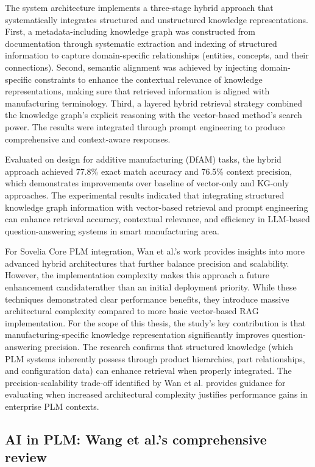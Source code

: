 The system architecture implements a three-stage hybrid approach that systematically integrates structured and unstructured knowledge representations. First, a metadata-including knowledge graph was constructed from documentation through systematic extraction and indexing of structured information to capture domain-specific relationships (entities, concepts, and their connections). Second, semantic alignment was achieved by injecting domain-specific constraints to enhance the contextual relevance of knowledge representations, making sure that retrieved information is aligned with manufacturing terminology. Third, a layered hybrid retrieval strategy combined the knowledge graph's explicit reasoning with the vector-based method's search power. The results were integrated through prompt engineering to produce comprehensive and context-aware responses. \parencite{wan_empowering_2025}

Evaluated on design for additive manufacturing (DfAM) tasks, the hybrid approach achieved 77.8\% exact match accuracy and 76.5\% context precision, which demonstrates improvements over baseline of vector-only and KG-only approaches. The experimental results indicated that integrating structured knowledge graph information with vector-based retrieval and prompt engineering can enhance retrieval accuracy, contextual relevance, and efficiency in LLM-based question-answering systems in smart manufacturing area. \parencite{wan_empowering_2025}

For Sovelia Core PLM integration, Wan et al.'s work provides insights into more advanced hybrid architectures that further balance precision and scalability. However, the implementation complexity makes this approach a future enhancement candidaterather than an initial deployment priority. While these techniques demonstrated clear performance benefits, they introduce massive architectural complexity compared to more basic vector-based RAG implementation. For the scope of this thesis, the study's key contribution is that manufacturing-specific knowledge representation significantly improves question-answering precision. The research confirms that structured knowledge (which PLM systems inherently possess through product hierarchies, part relationships, and configuration data) can enhance retrieval when properly integrated. The precision-scalability trade-off identified by Wan et al. provides guidance for evaluating when increased architectural complexity justifies performance gains in enterprise PLM contexts.

\subsection*{AI in PLM: Wang et al.'s comprehensive review}

